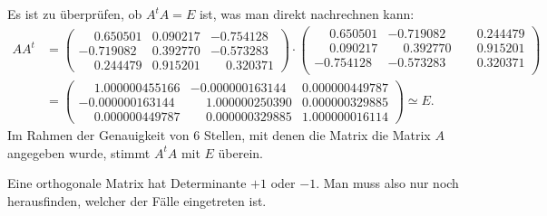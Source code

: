 \begin{loesung}
\begin{teilaufgaben}
\item Es ist zu überprüfen, ob $A^tA=E$ ist, was man direkt nachrechnen kann:
\begin{align*}
AA^t&=
\begin{pmatrix}
\phantom{-}0.650501&0.090217&          -0.754128\\
  -0.719082&0.392770&          -0.573283\\
\phantom{-}0.244479&0.915201&\phantom{-}0.320371
\end{pmatrix}
\cdot
\begin{pmatrix}
\phantom{-}0.650501&           -0.719082& \phantom{-}0.244479\\
\phantom{-}0.090217& \phantom{-}0.392770& \phantom{-}0.915201\\
  -0.754128&           -0.573283& \phantom{-}0.320371\\
\end{pmatrix}
\\
&=
\begin{pmatrix}
\phantom{-}1.000000455166&          -0.000000163144&0.000000449787\\
  -0.000000163144&\phantom{-}1.000000250390&0.000000329885\\
\phantom{-}0.000000449787&\phantom{-}0.000000329885&1.000000016114
\end{pmatrix}
\simeq E.
\end{align*}
Im Rahmen der Genauigkeit von 6 Stellen, mit denen die Matrix die
Matrix $A$ angegeben wurde, stimmt $A^tA$ mit $E$ überein.
\item Eine orthogonale Matrix hat Determinante $+1$ oder $-1$. Man muss
also nur noch herausfinden, welcher der Fälle eingetreten ist.


\end{teilaufgaben}
\end{loesung}
